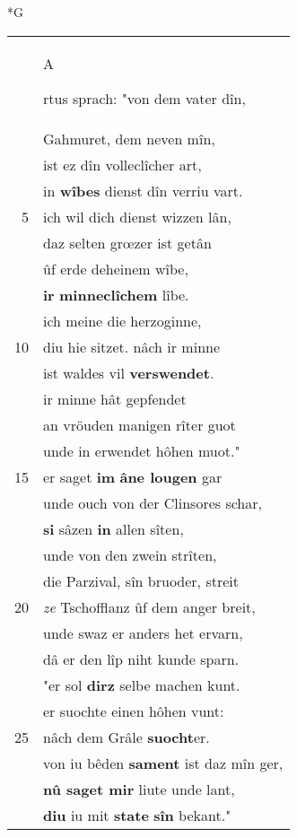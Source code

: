 \documentclass[8pt,a4paper,notitlepage]{article}
\begin{document}
\begin{table}[ht]
\begin{minipage}[t]{0.5\linewidth}
\small
\begin{center}*G
\end{center}
\begin{tabular}{rl}
 & \begin{large}A\end{large}rtus sprach: "von dem vater dîn,\\ 
 & Gahmuret, dem neven mîn,\\ 
 & ist ez dîn volleclîcher art,\\ 
 & in \textbf{wîbes} dienst dîn verriu vart.\\ 
5 & ich wil dich dienst wizzen lân,\\ 
 & daz selten grœzer ist getân\\ 
 & ûf erde deheinem wîbe,\\ 
 & \textbf{ir} \textbf{minneclîchem} lîbe.\\ 
 & ich meine die herzoginne,\\ 
10 & diu hie sitzet. nâch ir minne\\ 
 & ist waldes vil \textbf{verswendet}.\\ 
 & ir minne hât gepfendet\\ 
 & an vröuden manigen rîter guot\\ 
 & unde in erwendet hôhen muot."\\ 
15 & er saget \textbf{im} \textbf{âne lougen} gar\\ 
 & unde ouch von der Clinsores schar,\\ 
 & \textbf{si} sâzen \textbf{in} allen sîten,\\ 
 & unde von den zwein strîten,\\ 
 & die Parzival, sîn bruoder, streit\\ 
20 & \textit{ze} Tschofflanz ûf dem anger breit,\\ 
 & unde swaz er anders het ervarn,\\ 
 & dâ er den lîp niht kunde sparn.\\ 
 & "er sol \textbf{dirz} selbe machen kunt.\\ 
 & er suochte einen hôhen vunt:\\ 
25 & nâch dem Grâle \textbf{suocht}er.\\ 
 & von iu bêden \textbf{sament} ist daz mîn ger,\\ 
 & \textbf{nû saget mir} liute unde lant,\\ 
 & \textbf{diu} iu mit \textbf{state} \textbf{sîn} bekant."\\ 

\end{tabular}
\end{minipage}
\end{table}
\end{document}
